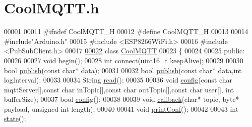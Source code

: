 \hypertarget{_cool_m_q_t_t_8h_source}{}\section{Cool\+M\+Q\+T\+T.\+h}

\begin{DoxyCode}
00001 
00011 \textcolor{preprocessor}{#ifndef CoolMQTT\_H}
00012 \textcolor{preprocessor}{#define CoolMQTT\_H}
00013 
00014 \textcolor{preprocessor}{#include"Arduino.h"}  
00015 \textcolor{preprocessor}{#include <ESP8266WiFi.h>}
00016 \textcolor{preprocessor}{#include <PubSubClient.h>}
00017 
\hyperlink{class_cool_m_q_t_t}{00022} \textcolor{keyword}{class }\hyperlink{class_cool_m_q_t_t}{CoolMQTT}
00023 \{
00024 
00025 \textcolor{keyword}{public}:
00026 
00027     \textcolor{keywordtype}{void} \hyperlink{class_cool_m_q_t_t_ac9248808641ebf3054ed0620ea9d0100}{begin}();
00028     \textcolor{keywordtype}{int} \hyperlink{class_cool_m_q_t_t_a58b0b1f64b269c2681685208262fba1d}{connect}(uint16\_t keepAlive);
00029 
00030     \textcolor{keywordtype}{bool} \hyperlink{class_cool_m_q_t_t_ace977b3e90ab14b1199fe5c4fb0a13ec}{publish}(\textcolor{keyword}{const} \textcolor{keywordtype}{char}* data);
00031 
00032     \textcolor{keywordtype}{bool} \hyperlink{class_cool_m_q_t_t_ace977b3e90ab14b1199fe5c4fb0a13ec}{publish}(\textcolor{keyword}{const} \textcolor{keywordtype}{char}* data,\textcolor{keywordtype}{int} logInterval);
00033 
00034     String \hyperlink{class_cool_m_q_t_t_ae3c18f6ae9723746d32765f1c8f176ca}{read}();
00035 
00036     \textcolor{keywordtype}{void} \hyperlink{class_cool_m_q_t_t_a6571671781a505feca9a8a56e256c6bc}{config}(\textcolor{keyword}{const} \textcolor{keywordtype}{char} mqttServer[],\textcolor{keyword}{const} \textcolor{keywordtype}{char} inTopic[],\textcolor{keyword}{const} \textcolor{keywordtype}{char} outTopic[],\textcolor{keyword}{const} \textcolor{keywordtype}{char} user[],\textcolor{keywordtype}{
      int} bufferSize);
00037     \textcolor{keywordtype}{bool} \hyperlink{class_cool_m_q_t_t_a6571671781a505feca9a8a56e256c6bc}{config}();
00038 
00039     \textcolor{keywordtype}{void} \hyperlink{class_cool_m_q_t_t_a30d82ad665bfb603f46ecdbc290775df}{callback}(\textcolor{keywordtype}{char}* topic, byte* payload, \textcolor{keywordtype}{unsigned} \textcolor{keywordtype}{int} length);
00040 
00041     \textcolor{keywordtype}{void} \hyperlink{class_cool_m_q_t_t_a40553a0ad4b5ecf1cb4411ab54ca85fb}{printConf}();
00042 
00043     \textcolor{keywordtype}{int} \hyperlink{class_cool_m_q_t_t_a5d003307eff78efbd585e42b43b72b6d}{state}();

\end{DoxyCode}
